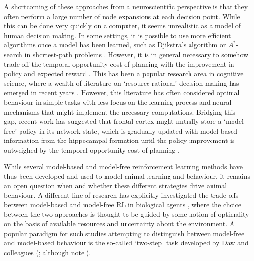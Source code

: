 A shortcoming of these approaches from a neuroscientific perspective is that they often perform a large number of node expansions at each decision point.
While this can be done very quickly on a computer, it seems unrealistic as a model of human decision making.
In some settings, it is possible to use more efficient algorithms once a model has been learned, such as Djikstra's algorithm or $A^*$-search in shortest-path problems \citep{hart1968formal}.
However, it is in general necessary to somehow trade off the temporal opportunity cost of planning with the improvement in policy and expected reward \citep{botvinick2014computational,agrawal2022temporal}.
This has been a popular research area in cognitive science, where a wealth of literature on `resource-rational' decision making has emerged in recent years \citep{griffiths2019doing,callaway2022rational}.
However, this literature has often considered optimal behaviour in simple tasks with less focus on the learning process and neural mechanisms that might implement the necessary computations.
Bridging this gap, recent work has suggested that frontal cortex might initially store a `model-free' policy in its network state, which is gradually updated with model-based information from the hippocampal formation until the policy improvement is outweighed by the temporal opportunity cost of planning \citep{jensen2023recurrent}.

While several model-based and model-free reinforcement learning methods have thus been developed and used to model animal learning and behaviour, it remains an open question when and whether these different strategies drive animal behaviour.
A different line of research has explicitly investigated the trade-offs between model-based and model-free RL in biological agents \citep{daw2005uncertainty, geerts2020general, lengyel2007hippocampal}, where the choice between the two approaches is thought to be guided by some notion of optimality on the basis of available resources and uncertainty about the environment.
A popular paradigm for such studies attempting to distinguish between model-free and model-based behaviour is the so-called `two-step' task developed by Daw and colleagues (\citealp{daw2011model,momennejad2017successor,wang2018prefrontal}; although note \citealp{akam2015simple}).

